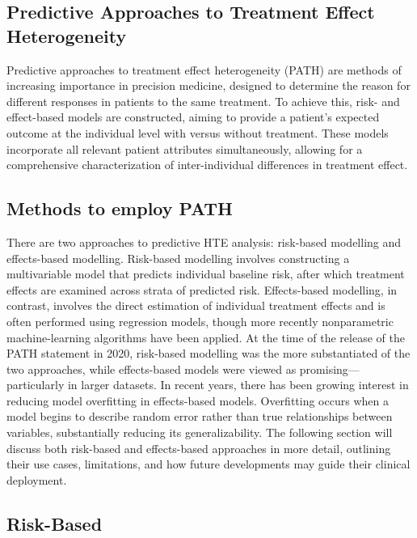 \documentclass{article}
\begin{document}
\subsection{Predictive Approaches to Treatment Effect
Heterogeneity}\label{predictive-approaches-to-treatment-effect-heterogeneity}

Predictive approaches to treatment effect heterogeneity (PATH) are
methods of increasing importance in precision medicine, designed to
determine the reason for different responses in patients to the same
treatment. To achieve this, risk- and effect-based models are
constructed, aiming to provide a patient's expected outcome at the
individual level with versus without treatment. These models incorporate
all relevant patient attributes simultaneously, allowing for a
comprehensive characterization of inter-individual differences in
treatment effect.

\subsection{Methods to employ PATH}\label{methods-to-employ-path}

There are two approaches to predictive HTE analysis: risk-based
modelling and effects-based modelling. Risk-based modelling involves
constructing a multivariable model that predicts individual baseline
risk, after which treatment effects are examined across strata of
predicted risk. Effects-based modelling, in contrast, involves the
direct estimation of individual treatment effects and is often performed
using regression models, though more recently nonparametric
machine-learning algorithms have been applied. At the time of the
release of the PATH statement in 2020, risk-based modelling was the more
substantiated of the two approaches, while effects-based models were
viewed as promising---particularly in larger datasets. In recent years,
there has been growing interest in reducing model overfitting in
effects-based models. Overfitting occurs when a model begins to describe
random error rather than true relationships between variables,
substantially reducing its generalizability. The following section will
discuss both risk-based and effects-based approaches in more detail,
outlining their use cases, limitations, and how future developments may
guide their clinical deployment.

\subsection{Risk-Based}\label{risk-based}
\end{document}
